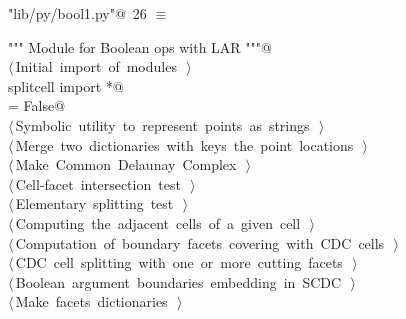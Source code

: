 \documentclass[11pt,oneside]{article}	%
\begin{document}
\begin{flushleft} \small \label{scrap33}
\protect{}\verb@"lib/py/bool1.py"@\nobreak\ {\footnotesize 26 }$\equiv$
\vspace{-1ex}
\begin{list}{}{} \item
\mbox{}\verb@""" Module for Boolean ops with LAR """@\\
\mbox{}\verb@@\hbox{$\langle\,$Initial import of modules\nobreak\ {\footnotesize {}}$\,\rangle$}\verb@@\\
\mbox{}\verb@from splitcell import *@\\
\mbox{}\verb@DEBUG = False@\\
\mbox{}\verb@@\hbox{$\langle\,$Symbolic utility to represent points as strings\nobreak\ {\footnotesize {}}$\,\rangle$}\verb@@\\
\mbox{}\verb@@\hbox{$\langle\,$Merge two dictionaries with keys the point locations\nobreak\ {\footnotesize {}}$\,\rangle$}\verb@@\\
\mbox{}\verb@@\hbox{$\langle\,$Make Common Delaunay Complex\nobreak\ {\footnotesize {}}$\,\rangle$}\verb@@\\
\mbox{}\verb@@\hbox{$\langle\,$Cell-facet intersection test\nobreak\ {\footnotesize {}}$\,\rangle$}\verb@@\\
\mbox{}\verb@@\hbox{$\langle\,$Elementary splitting test\nobreak\ {\footnotesize {}}$\,\rangle$}\verb@@\\
\mbox{}\verb@@\hbox{$\langle\,$Computing the adjacent cells of a given cell\nobreak\ {\footnotesize {}}$\,\rangle$}\verb@@\\
\mbox{}\verb@@\hbox{$\langle\,$Computation of boundary facets covering with CDC cells\nobreak\ {\footnotesize {}}$\,\rangle$}\verb@@\\
\mbox{}\verb@@\hbox{$\langle\,$CDC cell splitting with one or more cutting facets\nobreak\ {\footnotesize {}}$\,\rangle$}\verb@@\\
\mbox{}\verb@@\hbox{$\langle\,$Boolean argument boundaries embedding in SCDC\nobreak\ {\footnotesize {}}$\,\rangle$}\verb@@\\
\mbox{}\verb@@\hbox{$\langle\,$Make facets dictionaries\nobreak\ {\footnotesize {}}$\,\rangle$}\verb@@\\

\end{list}
\end{flushleft}
\end{document}
